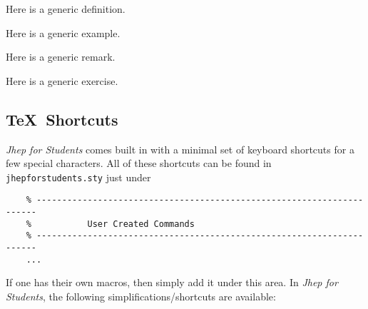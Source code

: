 \documentclass[10pt]{article}
\begin{document}
	\begin{definition}
		Here is a generic definition.
	\end{definition}
	\begin{example}
		Here is a generic example.
	\end{example}	
	\begin{remark}
		Here is a generic remark.
	\end{remark}
	\begin{exercise}
		Here is a generic exercise.
	\end{exercise}
	
	\subsection{\TeX\ Shortcuts}
	\textit{Jhep for Students} comes built in with a minimal set of keyboard shortcuts for a few special characters. All of these shortcuts can be found in \texttt{jhepforstudents.sty} just under
	\begin{verbatim}
	% ----------------------------------------------------------------------
	%           User Created Commands
	% ----------------------------------------------------------------------
	...
	\end{verbatim}
	If one has their own macros, then simply add it under this area. In \textit{Jhep for Students}, the following simplifications/shortcuts are available:
\end{document}

